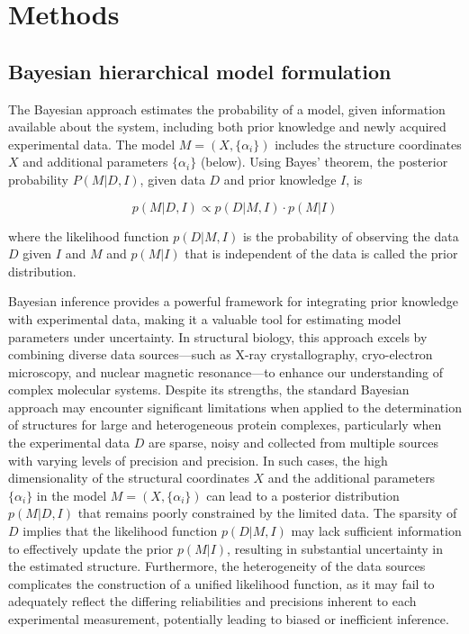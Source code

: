 \documentclass[pdflatex,sn-mathphys-num]{sn-jnl}%
\theoremstyle{thmstyleone}%
\theoremstyle{thmstyletwo}%
\theoremstyle{thmstylethree}%
\begin{document}
{\section{Methods}\label{sec2}
\subsection{Bayesian hierarchical model formulation}
The Bayesian approach \cite{Rieping05Science309p303} estimates the probability of a model, given information available about the system, including both prior knowledge and newly acquired experimental data. The model $M=(X,\{\alpha_i\})$ includes the structure coordinates $X$ and additional parameters $\{\alpha_i\}$ (below). Using Bayes’ theorem, the posterior probability $P(M|D,I)$, given data $D$ and prior knowledge $I$, is
 
\begin{equation}
    p(M|D,I) \propto p(D|M,I) \cdot p(M|I)
\end{equation}

where the likelihood function $p(D|M,I)$ is the probability
of observing the data $D$ given $I$ and $M$ and $p(M|I)$ that is independent of the data is called the prior distribution. 

Bayesian inference provides a powerful framework for integrating prior knowledge with experimental data, making it a valuable tool for estimating model parameters under uncertainty. In structural biology, this approach excels by combining diverse data sources—such as X-ray crystallography, cryo-electron microscopy, and nuclear magnetic resonance—to enhance our understanding of complex molecular systems. Despite its strengths, the standard Bayesian approach may encounter significant limitations when applied to the determination of structures for large and heterogeneous protein complexes, particularly when the experimental data $D$ are sparse, noisy and collected from multiple sources with varying levels of precision and precision. In such cases, the high dimensionality of the structural coordinates $X$ and the additional parameters $\{\alpha_i\}$ in the model $M=(X,\{\alpha_i\})$ can lead to a posterior distribution $p(M|D,I)$ that remains poorly constrained by the limited data. The sparsity of $D$ implies that the likelihood function $p(D|M,I)$ may lack sufficient information to effectively update the prior $p(M|I)$, resulting in substantial uncertainty in the estimated structure. Furthermore, the heterogeneity of the data sources complicates the construction of a unified likelihood function, as it may fail to adequately reflect the differing reliabilities and precisions inherent to each experimental measurement, potentially leading to biased or inefficient inference.

}
\end{document}
